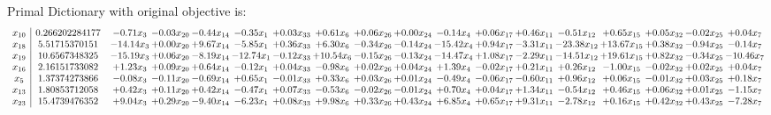 \documentclass[9pt]{article}
\begin{document}
Primal Dictionary with original objective is:
\[\begin{array}{c| c c@{\hskip 2pt} c@{\hskip 2pt} c@{\hskip 2pt} c@{\hskip 2pt} c@{\hskip 2pt} c@{\hskip 2pt} c@{\hskip 2pt} c@{\hskip 2pt} c@{\hskip 2pt} c@{\hskip 2pt} c@{\hskip 2pt} c@{\hskip 2pt} c@{\hskip 2pt} c@{\hskip 2pt} c@{\hskip 2pt} c@{\hskip 2pt} }
 x_{10}   &  0.266202284177 & -0.71 x_{3} & -0.03 x_{20} & -0.44 x_{14} & -0.35 x_{1} & +  0.03 x_{33} & +  0.61 x_{6} & +  0.06 x_{26} & +  0.00 x_{24} & -0.14 x_{4} & +  0.06 x_{17} & +  0.46 x_{11} & -0.51 x_{12} & +  0.65 x_{15} & +  0.05 x_{32} & -0.02 x_{25} & +  0.04 x_{7}\\
 x_{18}   &  5.51715370151 & -14.14 x_{3} & +  0.00 x_{20} & +  9.67 x_{14} & -5.85 x_{1} & +  0.36 x_{33} & +  6.30 x_{6} & -0.34 x_{26} & -0.14 x_{24} & -15.42 x_{4} & +  0.94 x_{17} & -3.31 x_{11} & -23.38 x_{12} & + 13.67 x_{15} & +  0.38 x_{32} & -0.94 x_{25} & -0.14 x_{7}\\
 x_{19}   &  10.6567348325 & -15.19 x_{3} & +  0.06 x_{20} & -8.19 x_{14} & -12.74 x_{1} & -0.12 x_{33} & + 10.54 x_{6} & -0.15 x_{26} & -0.13 x_{24} & -14.47 x_{4} & +  1.08 x_{17} & -2.29 x_{11} & -14.51 x_{12} & + 19.61 x_{15} & +  0.82 x_{32} & -0.34 x_{25} & -10.46 x_{7}\\
 x_{16}   &  2.16151733082 & +  1.23 x_{3} & +  0.09 x_{20} & +  0.64 x_{14} & -0.12 x_{1} & +  0.04 x_{33} & -0.98 x_{6} & +  0.02 x_{26} & +  0.04 x_{24} & +  1.39 x_{4} & -0.02 x_{17} & +  0.21 x_{11} & +  0.26 x_{12} & -1.00 x_{15} & -0.02 x_{32} & +  0.02 x_{25} & +  0.04 x_{7}\\
 x_{5}   &  1.37374273866 & -0.08 x_{3} & -0.11 x_{20} & -0.69 x_{14} & +  0.65 x_{1} & -0.01 x_{33} & +  0.33 x_{6} & +  0.03 x_{26} & +  0.01 x_{24} & -0.49 x_{4} & -0.06 x_{17} & -0.60 x_{11} & +  0.96 x_{12} & +  0.06 x_{15} & -0.01 x_{32} & +  0.03 x_{25} & +  0.18 x_{7}\\
 x_{13}   &  1.80853712058 & +  0.42 x_{3} & +  0.11 x_{20} & +  0.42 x_{14} & -0.47 x_{1} & +  0.07 x_{33} & -0.53 x_{6} & -0.02 x_{26} & -0.01 x_{24} & +  0.70 x_{4} & +  0.04 x_{17} & +  1.34 x_{11} & -0.54 x_{12} & +  0.46 x_{15} & +  0.06 x_{32} & +  0.01 x_{25} & -1.15 x_{7}\\
 x_{23}   &  15.4739476352 & +  9.04 x_{3} & +  0.29 x_{20} & -9.40 x_{14} & -6.23 x_{1} & +  0.08 x_{33} & +  9.98 x_{6} & +  0.33 x_{26} & +  0.43 x_{24} & +  6.85 x_{4} & +  0.65 x_{17} & +  9.31 x_{11} & -2.78 x_{12} & +  0.16 x_{15} & +  0.42 x_{32} & +  0.43 x_{25} & -7.28 x_{7}\\

\end{array}\]
\end{document}
